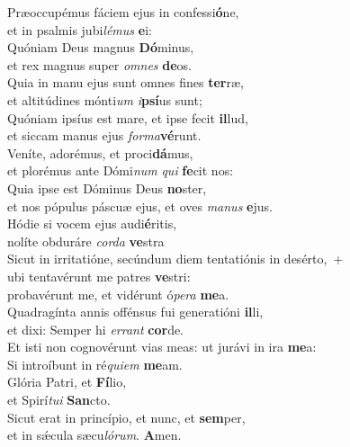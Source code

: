 \evenverse Præoccupémus fáciem ejus in confessi\textbf{ó}ne,~\*\\
\evenverse et in psalmis jubi\textit{lé}\textit{mus} \textbf{e}i:\\
\oddverse Quóniam Deus magnus \textbf{Dó}minus,~\*\\
\oddverse et rex magnus super \textit{om}\textit{nes} \textbf{de}os.\\
\evenverse Quia in manu ejus sunt omnes fines \textbf{ter}ræ,~\*\\
\evenverse et altitúdines mónti\textit{um} \textit{i}\textbf{psí}us sunt;\\
\oddverse Quóniam ipsíus est mare, et ipse fecit \textbf{il}lud,~\*\\
\oddverse et siccam manus ejus \textit{for}\textit{ma}\textbf{vé}runt.\\
\evenverse Veníte, adorémus, et proci\textbf{dá}mus,~\*\\
\evenverse et plorémus ante Dómi\textit{num} \textit{qui} \textbf{fe}cit nos:\\
\oddverse Quia ipse est Dóminus Deus \textbf{no}ster,~\*\\
\oddverse et nos pópulus páscuæ ejus, et oves \textit{ma}\textit{nus} \textbf{e}jus.\\
\evenverse Hódie si vocem ejus audi\textbf{é}ritis,~\*\\
\evenverse nolíte obduráre \textit{cor}\textit{da} \textbf{ve}stra\\
\oddverse Sicut in irritatióne, secúndum diem tentatiónis in desérto,~+\\
\oddverse  ubi tentavérunt me patres \textbf{ve}stri:~\*\\
\oddverse probavérunt me, et vidérunt ó\textit{pe}\textit{ra} \textbf{me}a.\\
\evenverse Quadragínta annis offénsus fui generatióni \textbf{il}li,~\*\\
\evenverse et dixi: Semper hi \textit{er}\textit{rant} \textbf{cor}de.\\
\oddverse Et isti non cognovérunt vias meas: ut jurávi in ira \textbf{me}a:~\*\\
\oddverse Si introíbunt in ré\textit{qui}\textit{em} \textbf{me}am.\\
\evenverse Glória Patri, et \textbf{Fí}lio,~\*\\
\evenverse et Spirí\textit{tu}\textit{i} \textbf{San}cto.\\
\oddverse Sicut erat in princípio, et nunc, et \textbf{sem}per,~\*\\
\oddverse et in sǽcula sæcu\textit{ló}\textit{rum}. \textbf{A}men.\\
